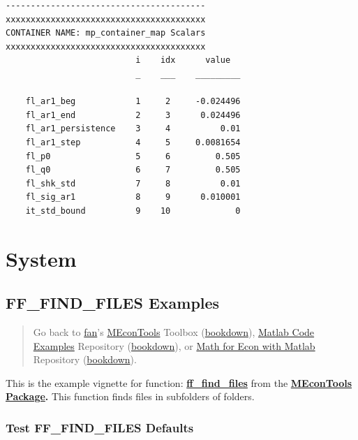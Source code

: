 \documentclass[
]{book}
\begin{document}
\begin{verbatim}
----------------------------------------
xxxxxxxxxxxxxxxxxxxxxxxxxxxxxxxxxxxxxxxx
CONTAINER NAME: mp_container_map Scalars
xxxxxxxxxxxxxxxxxxxxxxxxxxxxxxxxxxxxxxxx
                          i    idx      value  
                          _    ___    _________

    fl_ar1_beg            1     2     -0.024496
    fl_ar1_end            2     3      0.024496
    fl_ar1_persistence    3     4          0.01
    fl_ar1_step           4     5     0.0081654
    fl_p0                 5     6         0.505
    fl_q0                 6     7         0.505
    fl_shk_std            7     8          0.01
    fl_sig_ar1            8     9      0.010001
    it_std_bound          9    10             0
\end{verbatim}

\hypertarget{system}{%
\chapter{System}\label{system}}

\hypertarget{ff_find_files-examples}{%
\section{FF\_FIND\_FILES Examples}\label{ff_find_files-examples}}

\begin{quote}
Go back to \href{http://fanwangecon.github.io/}{fan}'s \href{https://fanwangecon.github.io/MEconTools/}{MEconTools} Toolbox (\href{https://fanwangecon.github.io/MEconTools/bookdown}{bookdown}), \href{https://fanwangecon.github.io/M4Econ/}{Matlab Code Examples} Repository (\href{https://fanwangecon.github.io/M4Econ/bookdown}{bookdown}), or \href{https://fanwangecon.github.io/Math4Econ/}{Math for Econ with Matlab} Repository (\href{https://fanwangecon.github.io/Math4Econ/bookdown}{bookdown}).
\end{quote}

This is the example vignette for function:
\href{https://github.com/FanWangEcon/MEconTools/blob/master/MEconTools/sys/ff_find_files.m}{\textbf{ff\_find\_files}}
from the \href{https://fanwangecon.github.io/MEconTools/}{\textbf{MEconTools
Package}}\textbf{.} This function
finds files in subfolders of folders.

\hypertarget{test-ff_find_files-defaults}{%
\subsection{Test FF\_FIND\_FILES Defaults}\label{test-ff_find_files-defaults}}
\end{document}
